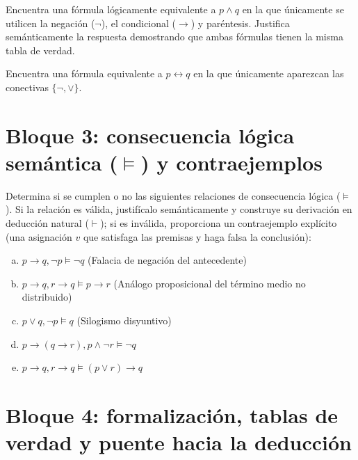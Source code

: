 \begin{pregunta}\label{e2-negcond}
Encuentra una fórmula lógicamente equivalente a $p \land q$ en la que únicamente se utilicen la negación ($\neg$), el condicional ($\to$) y paréntesis. Justifica semánticamente la respuesta demostrando que ambas fórmulas tienen la misma tabla de verdad.
\end{pregunta}

\begin{pregunta}\label{e2-negdisy}
Encuentra una fórmula equivalente a $p \leftrightarrow q$ en la que únicamente aparezcan las conectivas $\{\neg, \lor\}$.
\end{pregunta}

\section*{Bloque 3: consecuencia lógica semántica (\texorpdfstring{$\models$}{consecuencia}) y contraejemplos}

\begin{pregunta}\label{e2-consec}
Determina si se cumplen o no las siguientes relaciones de consecuencia lógica ($\models$). Si la relación es válida, justifícalo semánticamente y construye su derivación en deducción natural ($\vdash$); si es inválida, proporciona un contraejemplo explícito (una asignación $v$ que satisfaga las premisas y haga falsa la conclusión):
\begin{enumerate}[(a)]
    \item $p \to q, \neg p \models \neg q$ \hfill (Falacia de negación del antecedente)
    \item $p \to q, r \to q \models p \to r$ \hfill (Análogo proposicional del término medio no distribuido)
    \item $p \lor q, \neg p \models q$ \hfill (Silogismo disyuntivo)
    \item $p \to (q \to r), p \land \neg r \models \neg q$
    \item $p \to q, r \to q \models (p \lor r) \to q$
\end{enumerate}
\end{pregunta}

\section*{Bloque 4: formalización, tablas de verdad y puente hacia la deducción}

